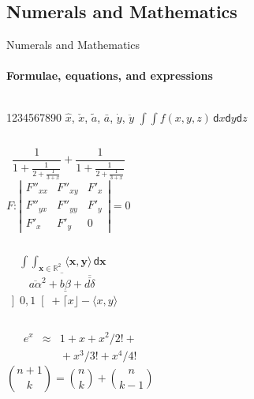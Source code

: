 \documentclass{beamer}
\begin{document}
    \subsection{Numerals and Mathematics}
    \begin{frame}[label=math]{Numerals and Mathematics}
      \framesubtitle{Formulae, equations, and expressions}
      \begin{columns}[onlytextwidth]
          1234567890
          $\hat{x}$, $\check{x}$, $\tilde{a}$,
          $\bar{a}$, $\dot{y}$, $\ddot{y}$
          $\int \!\! \int f(x,y,z)\,\mathsf{d}x\mathsf{d}y\mathsf{d}z$
      \end{columns}
      \begin{columns}[onlytextwidth]
          $$\frac{1}{\displaystyle 1+
            \frac{1}{\displaystyle 2+
            \frac{1}{\displaystyle 3+x}}} +
            \frac{1}{1+\frac{1}{2+\frac{1}{3+x}}}$$
          $$F:\left| \begin{array}{ccc}
          F''_{xx} & F''_{xy} &  F'_x \\
          F''_{yx} & F''_{yy} &  F'_y \\
          F'_x     & F'_y     & 0
          \end{array}\right| = 0$$
      \end{columns}
      \begin{columns}[onlytextwidth]
          $$\mathop{\int \!\!\! \int}_{\mathbf{x} \in \mathds{R}^2}
          \! \langle \mathbf{x},\mathbf{y}\rangle\,\mathsf{d}\mathbf{x}$$
          $$\overline{\overline{a\alpha}^2+\underline{b\beta}
           +\overline{\overline{d\delta}}}$$
          $\left] 0,1\right[ + \lceil x \rfloor - \langle x,y\rangle$
      \end{columns}
      \begin{columns}[onlytextwidth]
          \begin{eqnarray*}
           e^x &\approx& 1+x+x^2/2! + \\
             && {}+x^3/3! + x^4/4!
          \end{eqnarray*}
          $${n+1\choose k} = {n\choose k} + {n \choose k-1}$$
      \end{columns}
    \end{frame}
\end{document}
